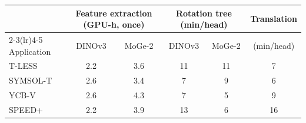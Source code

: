\begin{tabular}{@{}l cc cc c@{}}
\toprule
 & \multicolumn{2}{c}{Feature extraction (GPU-h, once)} & \multicolumn{2}{c}{Rotation tree (min/head)} & Translation \\
\cmidrule(lr){2-3}\cmidrule(lr){4-5} Application & DINOv3 & MoGe-2 & DINOv3 & MoGe-2 & (min/head) \\
\midrule
T-LESS & 2.2 & 3.6 & 11 & 11 & 7 \\
SYMSOL-T & 2.6 & 3.4 & 7 & 9 & 6 \\
YCB-V & 2.6 & 4.3 & 7 & 5 & 9 \\
SPEED+ & 2.2 & 3.9 & 13 & 6 & 16 \\
\bottomrule
\end{tabular}